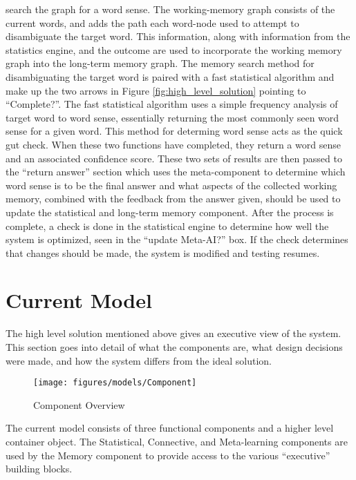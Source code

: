 search the graph for a word sense.  The working-memory graph consists of the current words, and 
adds the path each word-node used to attempt to disambiguate the target word. This information, 
along with information from the statistics engine, and the outcome are used to incorporate the 
working memory graph into the long-term memory graph.
The memory search method for disambiguating the target word is paired with a fast statistical 
algorithm and make up the two arrows in Figure \ref{fig:high_level_solution} pointing to 
``Complete?''. The fast statistical algorithm uses a simple frequency analysis of target word  
to word sense, essentially returning the most commonly seen word sense for a given word.
This method for determing word sense acts as the quick gut check. When these two   
functions have completed, they return a word sense and an associated confidence score.
These two sets of results are then passed to the ``return answer'' section which uses the
meta-component to determine which word sense is to be the final answer and what aspects of the 
collected working memory, combined with the feedback from the answer given, should be used to 
update the statistical and long-term memory component. After the 
process is complete, a check is done in the statistical engine to determine how well the 
system is optimized, seen in the ``update Meta-AI?'' box.  If the check determines that changes should 
be made, the system is modified and testing resumes.

\section{Current Model}

The high level solution mentioned above gives an executive view of the system.
This section goes into detail of what the components are, what design decisions
were made, and how the system differs from the ideal solution.

\begin{figure}[htp]     
	\begin{center}
		\texttt{[image: figures/models/Component]}
		\caption{Component Overview}     
	\end{center}     
	\label{fig:Component}
\end{figure}

The current model consists of three functional components and a higher level
container object.  The Statistical,
Connective, and Meta-learning components are used by the Memory component to
provide access to the various ``executive'' building blocks.


